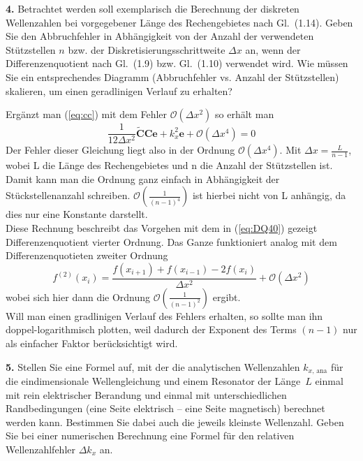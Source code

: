 \documentclass[Protokollheft.tex]{subfiles}
\begin{document}
    \begin{framed}
	\noindent \textbf{4.} Betrachtet werden soll exemplarisch die Berechnung der diskreten Wellenzahlen bei vorgegebener Länge des Rechengebietes nach Gl.~(1.14).
    Geben Sie den Abbruchfehler in Abhängigkeit von der Anzahl der verwendeten Stützstellen $n$ bzw. der Diskretisierungsschrittweite $\Delta x$ an,
    wenn der Differenzenquotient nach Gl.~(1.9) bzw. Gl.~(1.10) verwendet wird.
    Wie müssen Sie ein entsprechendes Diagramm (Abbruchfehler vs. Anzahl der Stützstellen) skalieren, um einen geradlinigen Verlauf zu erhalten?\label{exer:failureTerm}
\end{framed}
Ergänzt man (\ref{eq:cc}) mit dem Fehler $\mathcal{O}(\Delta x^2)$ so erhält man
	\begin{equation}
	\frac{1}{12\Delta x^2}\mathbf{\widetilde{C}Ce}+k^2_x\mathbf{e}+\mathcal{O}(\Delta x^4)=0
	\end{equation}
Der Fehler dieser Gleichung liegt also in der Ordnung $\mathcal{O}(\Delta x^4)$. Mit $\Delta x=\frac{L}{n-1}$, wobei L die Länge des Rechengebietes und n die Anzahl der Stützstellen ist. Damit kann man die Ordnung ganz einfach in Abhängigkeit der Stückstellenanzahl schreiben. $\mathcal{O}(\frac{1}{(n-1)^4})$ ist hierbei nicht von L anhängig, da dies nur eine Konstante darstellt.\\
Diese Rechnung beschreibt das Vorgehen mit dem in (\ref{eq:DQ40}) gezeigt Differenzenquotient vierter Ordnung. Das Ganze funktioniert analog mit dem Differenzenquotieten zweiter Ordnung
\begin{equation*}
f^{(2)}(x_i)=\frac{f(x_{i+1})+f(x_{i-1})-2f(x_i)}{\Delta x^2}+\mathcal{O}(\Delta x^2)
\end{equation*}
wobei sich hier dann die Ordnung $\mathcal{O}(\frac{1}{(n-1)^2})$ ergibt.\\
Will man einen gradlinigen Verlauf des Fehlers erhalten, so sollte man ihn doppel-logarithmisch plotten, weil dadurch der Exponent des Terms $(n-1)$ nur als einfacher Faktor berücksichtigt wird.

    \begin{framed}
	\noindent \textbf{5.} Stellen Sie eine Formel auf, mit der die analytischen Wellenzahlen $k_{x,\,\text{ana}}$ für die eindimensionale Wellengleichung und
    einem Resonator der Länge~\(L\) einmal mit rein elektrischer Berandung und einmal mit unterschiedlichen Randbedingungen
    (eine Seite elektrisch -- eine Seite magnetisch) berechnet werden kann. Bestimmen Sie dabei auch die jeweils kleinste Wellenzahl.
    Geben Sie bei einer numerischen Berechnung eine Formel für den relativen Wellenzahlfehler $\Delta k_{x}$ an.\label{exer:kxAnalytic}
\end{framed}
\end{document}
